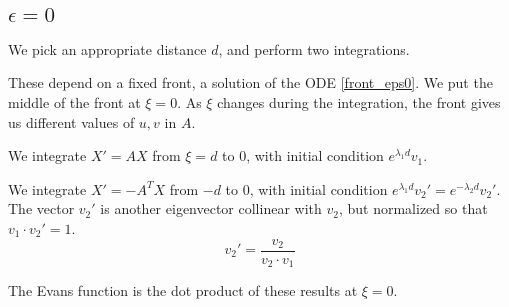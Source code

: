 \documentclass[10pt]{article}
\begin{document}
\subsection{$\epsilon = 0$}
We pick an appropriate distance $d$, and perform two integrations.

These depend on a fixed front, a solution of the ODE \eqref{front_eps0}.
We put the middle of the front at $\xi = 0$.  As $\xi$ changes during the integration, the front gives us different values of $u,v$ in $A$.

We integrate $X' = AX$ from $\xi = d$ to $0$, with initial condition $e^{\lambda_1 d}v_1$.

We integrate $X' = -A^T X$ from $-d$ to $0$, with initial condition $e^{\lambda_1 d}v_2' = e^{-\lambda_2 d}v_2'$. The vector $v_2'$ is another eigenvector collinear with $v_2$, but normalized so that $v_1 \cdot v_2' = 1$.
\[v_2' = \frac{v_2}{v_2 \cdot v_1}\]

The Evans function is the dot product of these results at $\xi = 0$.
\end{document}
